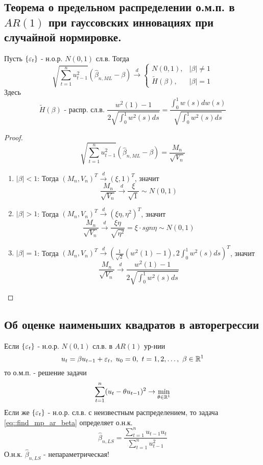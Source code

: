 \subsection{Теорема о предельном распределении о.м.п. в $AR(1)$ при гауссовских
инновациях при случайной нормировке.}
\begin{theorem}
    Пусть $\{\varepsilon_t\}$ - н.о.р. $N(0,1)$ сл.в. Тогда
    \[\sqrt{\sum_{t=1}^nu^2_{t-1}}(\widehat{\beta}_{n,ML}-\beta)\xrightarrow{d}\begin{cases}
        N(0,1),& \left\lvert \beta\right\rvert \neq1\\
        \widetilde{H}(\beta),& \left\lvert \beta\right\rvert =1
    \end{cases}\]
    Здесь
    \[\widetilde{H}(\beta)\text{ - распр. сл.в. }\frac{w^2(1)-1}{2\sqrt{\int_0^1w^2(s)ds}}=\frac{\int_0^1w(s)dw(s)}{\sqrt{\int^1_0w^2(s)ds}}\]
\end{theorem}
\begin{proof}
    \[\sqrt{\sum_{t=1}^nu^2_{t-1}}(\widehat{\beta}_{n,ML}-\beta)=\frac{M_n}{\sqrt{V_n}}\]
    \begin{enumerate}
        \item \underline{$\left\lvert \beta\right\rvert <1$}: Тогда $(M_n,V_n)^T\xrightarrow{d}(\xi,1)^T$, значит 
        \[\frac{M_n}{\sqrt{V_n}}\xrightarrow{d}\frac{\xi}{\sqrt{1}}\sim N(0,1)\]
        \item \underline{$\left\lvert \beta\right\rvert >1$}: Тогда $(M_n,V_n)^T\xrightarrow{d}(\xi\eta,\eta^2)^T$, значит 
        \[\frac{M_n}{\sqrt{V_n}}\xrightarrow{d}\frac{\xi\eta}{\sqrt{\eta^2}}=\xi\cdot sgn\eta\sim N(0,1)\]
        \item \underline{$\left\lvert \beta\right\rvert =1$}: Тогда $(M_n,V_n)^T\xrightarrow{d}\left(\frac{1}{\sqrt{2}}(w^2(1)-1),2\int_0^1w^2(s)ds\right)^T$, значит 
        \[\frac{M_n}{\sqrt{V_n}}\xrightarrow{d}\frac{w^2(1)-1}{2\sqrt{\int_0^1w^2(s)ds}}\]
    \end{enumerate}
\end{proof}

\subsection{Об оценке наименьших квадратов в авторегрессии}
Если $\{\varepsilon_t\}$ - н.о.р. $N(0,1)$ сл.в. в $AR(1)$ ур-нии
\begin{equation}
    u_t=\beta u_{t-1}+\eps_t,\ u_0=0,\ t=1,2,\ldots,\ \beta\in\R^1
\end{equation}
то о.м.п. - решение задачи
\begin{equation} \label{eq::find_mp_ar_beta}
    \sum_{t=1}^n(u_t-\theta u_{t-1})^2\rightarrow\min_{\theta\in\mathbb{R}^1}
\end{equation}
Если же $\{\varepsilon_t\}$ - н.о.р. сл.в. с неизвестным распределением, то задача \eqref{eq::find_mp_ar_beta}
определяет о.н.к.
\[\widehat{\beta}_{n,LS}=\frac{\sum_{t=1}^nu_{t-1}u_{t}}{\sum_{t=1}^nu^2_{t-1}}\]
О.н.к. $\widehat{\beta}_{n,LS}$ - непараметрическая!

